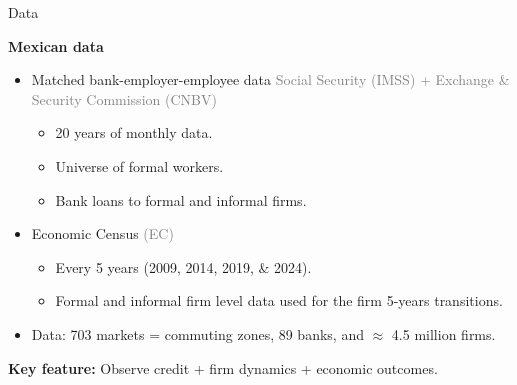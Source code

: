 \documentclass[aspectratio=169]{beamer}
\begin{document}
\begin{frame}{Data}\label{data}

\textbf{Mexican data}

\vspace{3mm}

\begin{itemize}
    \item Matched bank-employer-employee data \textcolor{gray}{Social Security (IMSS) +  Exchange \& Security Commission (CNBV)}
    \begin{itemize}
        \item 20 years of monthly data.
        \item Universe of formal workers.
        \item Bank loans to formal and informal firms.
    \end{itemize}
    \vspace{3mm}
    \pause
    \item Economic Census \textcolor{gray}{(EC)}
    \begin{itemize}
        \item Every 5 years (2009, 2014, 2019, \& 2024).
        \item Formal and informal firm level data used for the firm 5-years transitions.
    \end{itemize}
    \vspace{3mm}
    \pause
    \item Data: 703 markets = commuting zones, 89 banks, and $\approx$ 4.5 million firms.
\end{itemize}

\vspace{3mm}
\pause

\begin{center}
    \large \textbf{Key feature:} Observe credit + firm dynamics + economic outcomes.
\end{center}

\end{frame}

\end{document}
